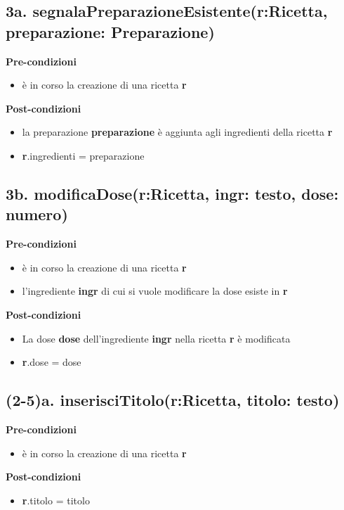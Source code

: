\documentclass[12pt]{extarticle}
\begin{document}
\subsection*{3a. segnalaPreparazioneEsistente(r:Ricetta, preparazione: Preparazione)}

\textbf{Pre-condizioni}
\begin{itemize}
  \item è in corso la creazione di una ricetta  \textbf{r}
\end{itemize}
\textbf{Post-condizioni}
\begin{itemize}
  \item la preparazione  \textbf{preparazione} è aggiunta agli ingredienti della ricetta  \textbf{r}
  \item \textbf{r}.ingredienti = preparazione
\end{itemize}

\subsection*{3b. modificaDose(r:Ricetta, ingr: testo, dose: numero)}

\textbf{Pre-condizioni}
\begin{itemize}
  \item è in corso la creazione di una ricetta  \textbf{r}
  \item l'ingrediente \textbf{ingr} di cui si vuole modificare la dose esiste in \textbf{r}
\end{itemize}
\textbf{Post-condizioni}
\begin{itemize}
  \item La dose \textbf{dose} dell'ingrediente \textbf{ingr} nella ricetta \textbf{r} è modificata
  \item \textbf{r}.dose = dose
\end{itemize}

\subsection*{(2-5)a. inserisciTitolo(r:Ricetta, titolo: testo)}

\textbf{Pre-condizioni}
\begin{itemize}
  \item è in corso la creazione di una ricetta  \textbf{r}
\end{itemize}
\textbf{Post-condizioni}
\begin{itemize}
  \item \textbf{r}.titolo = titolo
\end{itemize}
\end{document}
